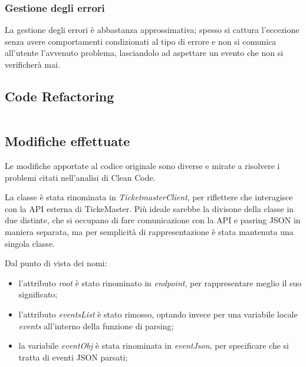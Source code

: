         \subsubsection{Gestione degli errori}
        La gestione degli errori è abbastanza approssimativa; spesso si cattura l'eccezione senza avere comportamenti condizionati al tipo di errore e non si comunica all'utente l'avvenuto problema,
        lasciandolo ad aspettare un evento che non si verificherà mai.
        
    \subsection{Code Refactoring}
        \inputminted[linenos, frame=lines]{java}{../new/JsonParser.java}

    \subsection{Modifiche effettuate}
    Le modifiche apportate al codice originale sono diverse e mirate a risolvere i problemi citati nell'analisi di Clean Code.

    La classe è stata rinominata in \textit{TicketmasterClient}, per riflettere che interagisce con la API esterna di TickeMaster.
    Più ideale sarebbe la divisone della classe in due distinte, che si occupano di fare comunicazione con la API e pasring JSON in maniera separata, ma 
    per semplicità di rappresentazione è stata mantenuta una singola classe.

    Dal punto di vista dei nomi:
    \begin{itemize}
        \item l'attributo \textit{root} è stato rinominato in \textit{endpoint}, per rappresentare meglio il suo significato;
        \item l'attributo \textit{eventsList} è stato rimosso, optando invece per una variabile locale \textit{events} all'interno della funzione di parsing;
        \item la variabile \textit{eventObj} è stata rinominata in \textit{eventJson}, per specificare che si tratta di eventi JSON parsati;
    \end{itemize}

